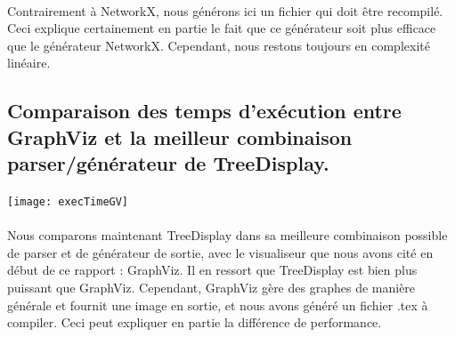 \paragraph{} Contrairement à NetworkX, nous générons ici un fichier qui doit être recompilé. Ceci explique certainement en partie le fait que ce générateur soit plus efficace que le générateur NetworkX. Cependant, nous restons toujours en complexité linéaire.

	\subsection{Comparaison des temps d'exécution entre GraphViz et la meilleur combinaison parser/générateur de TreeDisplay.}
	
\begin{center}

\texttt{[image: execTimeGV]}

\end{center}

\paragraph{} Nous comparons maintenant TreeDisplay dans sa meilleure combinaison possible de parser et de générateur de sortie, avec le visualiseur que nous avons cité en début de ce rapport : GraphViz. Il en ressort que TreeDisplay est bien plus puissant que GraphViz. Cependant, GraphViz gère des graphes de manière générale et fournit une image en sortie, et nous avons généré un fichier .tex à compiler. Ceci peut expliquer en partie la différence de performance.

% 
